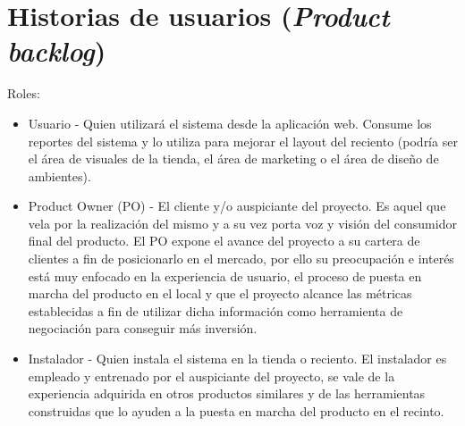 \documentclass[11pt]{charter}
\begin{document}
\newpage

\section{Historias de usuarios (\textit{Product backlog})}
\label{sec:backlog}

Roles:
\begin{itemize}
\item Usuario - Quien utilizará el sistema desde la aplicación web. Consume los reportes del sistema y lo utiliza para mejorar el layout del reciento (podría ser el área de visuales de la tienda, el área de marketing o el área de diseño de ambientes).
\item Product Owner (PO) - El cliente y/o auspiciante del proyecto. Es aquel que vela por la realización del mismo y a su vez porta voz y visión del consumidor final del producto. El PO expone el avance del proyecto a su cartera de clientes a fin de posicionarlo en el mercado, por ello su preocupación e interés está muy enfocado en la experiencia de usuario, el proceso de puesta en marcha del producto en el local y  que el proyecto alcance las métricas establecidas a fin de utilizar dicha información como herramienta de negociación para conseguir más inversión.
\item Instalador - Quien instala el sistema en la tienda o reciento. El instalador es empleado y entrenado por el auspiciante del proyecto, se vale de la experiencia adquirida en otros productos similares y de las herramientas construidas que lo ayuden a la puesta en marcha del producto en el recinto.
\end{itemize}
\end{document}
